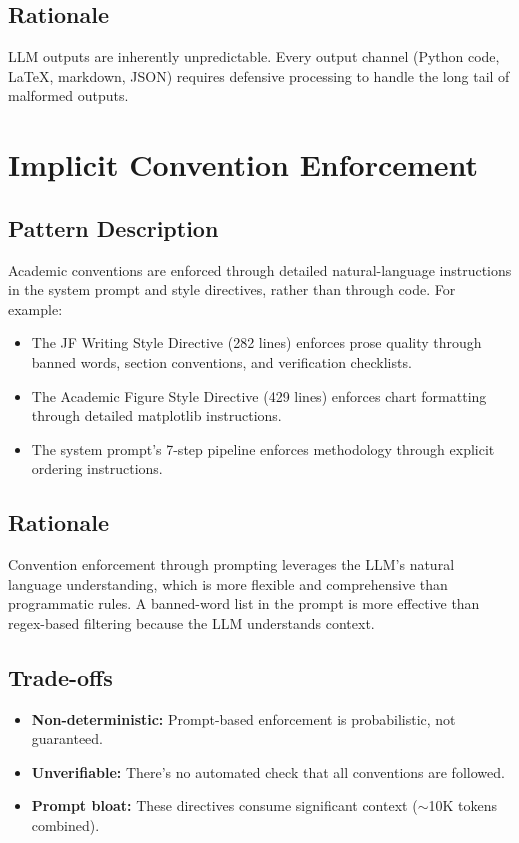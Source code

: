 \subsection{Rationale}

LLM outputs are inherently unpredictable.
Every output channel (Python code, \LaTeX{}, markdown, JSON) requires defensive processing to handle the long tail of malformed outputs.

\section{Implicit Convention Enforcement}
\label{sec:patterns:conventions}

\subsection{Pattern Description}

Academic conventions are enforced through detailed natural-language instructions in the system prompt and style directives, rather than through code.
For example:
\begin{itemize}
  \item The JF Writing Style Directive (282 lines) enforces prose quality through banned words, section conventions, and verification checklists.
  \item The Academic Figure Style Directive (429 lines) enforces chart formatting through detailed matplotlib instructions.
  \item The system prompt's 7-step pipeline enforces methodology through explicit ordering instructions.
\end{itemize}

\subsection{Rationale}

Convention enforcement through prompting leverages the LLM's natural language understanding, which is more flexible and comprehensive than programmatic rules.
A banned-word list in the prompt is more effective than regex-based filtering because the LLM understands context.

\subsection{Trade-offs}

\begin{itemize}
  \item \textbf{Non-deterministic:} Prompt-based enforcement is probabilistic, not guaranteed.
  \item \textbf{Unverifiable:} There's no automated check that all conventions are followed.
  \item \textbf{Prompt bloat:} These directives consume significant context ($\sim$10K tokens combined).
\end{itemize}

